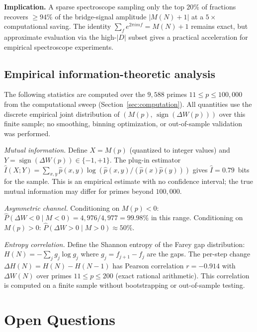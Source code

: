 \documentclass[11pt]{article}
\theoremstyle{definition}
\begin{document}
\textbf{Implication.}  A sparse spectroscope sampling only the top $20\%$
of fractions recovers $\ge 94\%$ of the bridge-signal amplitude
$|M(N)+1|$ at a $5\times$ computational saving.  The identity
$\sum_f e^{2\pi imf} = M(N)+1$ remains exact, but approximate
evaluation via the high-$|D|$ subset gives a practical acceleration
for empirical spectroscope experiments.

\subsection{Empirical information-theoretic analysis}

The following statistics are computed over the $9{,}588$ primes
$11 \le p \le 100{,}000$ from the computational sweep
(Section~\ref{sec:computation}).  All quantities use the
discrete empirical joint distribution of $(M(p),\,
\operatorname{sign}(\Delta W(p)))$ over this finite sample;
no smoothing, binning optimization, or out-of-sample validation
was performed.

\emph{Mutual information.}
Define $X = M(p)$ (quantized to integer values) and
$Y = \operatorname{sign}(\Delta W(p)) \in \{-1, +1\}$.
The plug-in estimator
$\hat{I}(X;Y) = \sum_{x,y} \hat{p}(x,y)
\log(\hat{p}(x,y)/(\hat{p}(x)\hat{p}(y)))$
gives $\hat{I} = 0.79$~bits for the sample.
This is an empirical estimate with no confidence interval;
the true mutual information may differ for primes beyond
$100{,}000$.

\emph{Asymmetric channel.}
Conditioning on $M(p) < 0$: $\hat{P}(\Delta W < 0 \mid M < 0)
= 4{,}976/4{,}977 = 99.98\%$ in this range.
Conditioning on $M(p) > 0$: $\hat{P}(\Delta W > 0 \mid M > 0)
\approx 50\%$.

\emph{Entropy correlation.}
Define the Shannon entropy of the Farey gap distribution:
$H(N) = -\sum_{j} g_j \log g_j$ where $g_j = f_{j+1} - f_j$
are the gaps.  The per-step change $\Delta H(N) = H(N) - H(N-1)$
has Pearson correlation $r = -0.914$ with $\Delta W(N)$ over
primes $11 \le p \le 200$ (exact rational arithmetic).
This correlation is computed on a finite sample without
bootstrapping or out-of-sample testing.


\section{Open Questions}\label{sec:open}
\end{document}

